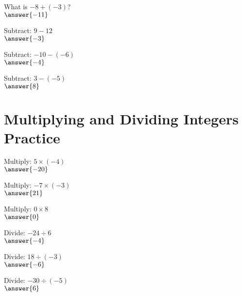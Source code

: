 \documentclass{ximera}
\begin{document}
\begin{problem}
What is $-8 + (-3)$?\\
$\answer{-11}$
\end{problem}

\begin{problem}
Subtract: $9 - 12$\\
$\answer{-3}$
\end{problem}

\begin{problem}
Subtract: $-10 - (-6)$\\
$\answer{-4}$
\end{problem}

\begin{problem}
Subtract: $3 - (-5)$\\
$\answer{8}$
\end{problem}



\section*{Multiplying and Dividing Integers Practice}

\begin{problem}
Multiply: $5 \times (-4)$\\
$\answer{-20}$
\end{problem}

\begin{problem}
Multiply: $-7 \times (-3)$\\
$\answer{21}$
\end{problem}

\begin{problem}
Multiply: $0 \times 8$\\
$\answer{0}$
\end{problem}

\begin{problem}
Divide: $-24 \div 6$\\
$\answer{-4}$
\end{problem}

\begin{problem}
Divide: $18 \div (-3)$\\
$\answer{-6}$
\end{problem}

\begin{problem}
Divide: $-30 \div (-5)$\\
$\answer{6}$
\end{problem}
\end{document}
